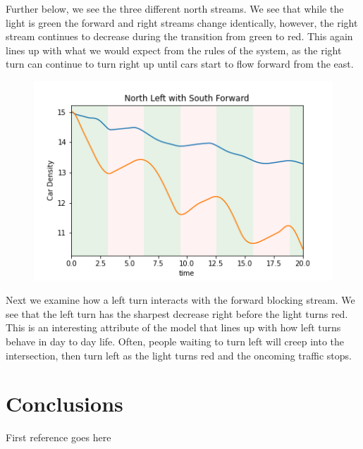 \documentclass[12pt]{article}
\begin{document}
Further below, we see the three different north streams. We see that while the light is green the forward and right streams change identically, however, the right stream continues to decrease during the transition from green to red. This again lines up with what we would expect from the rules of the system, as the right turn can continue to turn right up until cars start to flow forward from the east.\\

\begin{figure}[h!]
    \centering
    \includegraphics[width=12cm]{figures/NorthLeftwithSouthForward.png}
    \label{fig:NorthLeftwithSouthForward}
\end{figure}

Next we examine how a left turn interacts with the forward blocking stream. We see that the left turn has the sharpest decrease right before the light turns red. This is an interesting attribute of the model that lines up with how left turns behave in day to day life. Often, people waiting to turn left will creep into the intersection, then turn left as the light turns red and the oncoming traffic stops.\\

\section{Conclusions}

\begin{thebibliography}{99}
 First reference goes here
\end{thebibliography}
\end{document}
